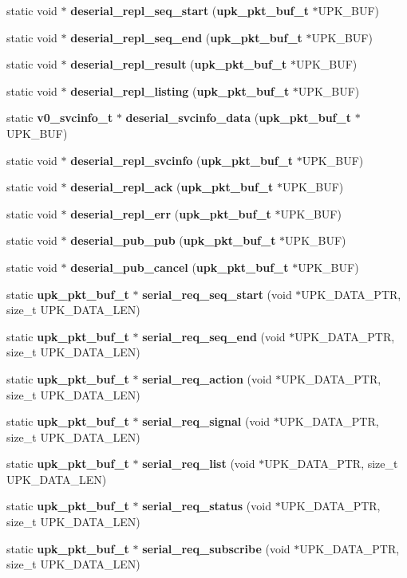 \begin{DoxyCompactItemize}
static void $\ast$ {\bf deserial\_\-repl\_\-seq\_\-start} ({\bf upk\_\-pkt\_\-buf\_\-t} $\ast$UPK\_\-BUF)
\item 
static void $\ast$ {\bf deserial\_\-repl\_\-seq\_\-end} ({\bf upk\_\-pkt\_\-buf\_\-t} $\ast$UPK\_\-BUF)
\item 
static void $\ast$ {\bf deserial\_\-repl\_\-result} ({\bf upk\_\-pkt\_\-buf\_\-t} $\ast$UPK\_\-BUF)
\item 
static void $\ast$ {\bf deserial\_\-repl\_\-listing} ({\bf upk\_\-pkt\_\-buf\_\-t} $\ast$UPK\_\-BUF)
\item 
static {\bf v0\_\-svcinfo\_\-t} $\ast$ {\bf deserial\_\-svcinfo\_\-data} ({\bf upk\_\-pkt\_\-buf\_\-t} $\ast$UPK\_\-BUF)
\item 
static void $\ast$ {\bf deserial\_\-repl\_\-svcinfo} ({\bf upk\_\-pkt\_\-buf\_\-t} $\ast$UPK\_\-BUF)
\item 
static void $\ast$ {\bf deserial\_\-repl\_\-ack} ({\bf upk\_\-pkt\_\-buf\_\-t} $\ast$UPK\_\-BUF)
\item 
static void $\ast$ {\bf deserial\_\-repl\_\-err} ({\bf upk\_\-pkt\_\-buf\_\-t} $\ast$UPK\_\-BUF)
\item 
static void $\ast$ {\bf deserial\_\-pub\_\-pub} ({\bf upk\_\-pkt\_\-buf\_\-t} $\ast$UPK\_\-BUF)
\item 
static void $\ast$ {\bf deserial\_\-pub\_\-cancel} ({\bf upk\_\-pkt\_\-buf\_\-t} $\ast$UPK\_\-BUF)
\item 
static {\bf upk\_\-pkt\_\-buf\_\-t} $\ast$ {\bf serial\_\-req\_\-seq\_\-start} (void $\ast$UPK\_\-DATA\_\-PTR, size\_\-t UPK\_\-DATA\_\-LEN)
\item 
static {\bf upk\_\-pkt\_\-buf\_\-t} $\ast$ {\bf serial\_\-req\_\-seq\_\-end} (void $\ast$UPK\_\-DATA\_\-PTR, size\_\-t UPK\_\-DATA\_\-LEN)
\item 
static {\bf upk\_\-pkt\_\-buf\_\-t} $\ast$ {\bf serial\_\-req\_\-action} (void $\ast$UPK\_\-DATA\_\-PTR, size\_\-t UPK\_\-DATA\_\-LEN)
\item 
static {\bf upk\_\-pkt\_\-buf\_\-t} $\ast$ {\bf serial\_\-req\_\-signal} (void $\ast$UPK\_\-DATA\_\-PTR, size\_\-t UPK\_\-DATA\_\-LEN)
\item 
static {\bf upk\_\-pkt\_\-buf\_\-t} $\ast$ {\bf serial\_\-req\_\-list} (void $\ast$UPK\_\-DATA\_\-PTR, size\_\-t UPK\_\-DATA\_\-LEN)
\item 
static {\bf upk\_\-pkt\_\-buf\_\-t} $\ast$ {\bf serial\_\-req\_\-status} (void $\ast$UPK\_\-DATA\_\-PTR, size\_\-t UPK\_\-DATA\_\-LEN)
\item 
static {\bf upk\_\-pkt\_\-buf\_\-t} $\ast$ {\bf serial\_\-req\_\-subscribe} (void $\ast$UPK\_\-DATA\_\-PTR, size\_\-t UPK\_\-DATA\_\-LEN)

\end{DoxyCompactItemize}
